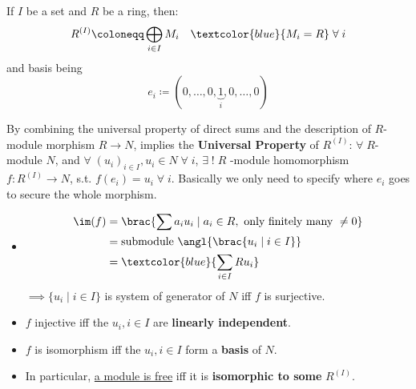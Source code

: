 \begin{notation}
	If \( I \) be a set and \( R \) be a ring, then:
	\[
		R^{(I)} \coloneqq \bigoplus_{i\in I}M_i \quad \textcolor{blue}{M_i = R} \; \forall \; i
	\]
	and basis being
	\[
		e_i \coloneqq (0, \ldots, 0, \underbrace{1}_{i}, 0, \ldots, 0)
	\]
\end{notation}
By combining the universal property of direct sums and the description of \( R \)-module morphism \(
R \to N\), implies the \textbf{Universal Property} of \( R^{(I)} \): \( \forall \; R  \)-module $N$,
and \( \forall \; (u_i)_{i\in I}, u_i \in N \; \forall \; i \), \( \exists \; ! \; R \) -module
homomorphism \( f: R^{(I)} \to N \), s.t. \( f(e_i) = u_i \; \forall \; i \). Basically we only need
to specify where \( e_i \) goes to secure the whole morphism.

\begin{note}
	\leavevmode
	\begin{itemize}
		\item
		      \[
			      \begin{aligned}
				      \im(f) & = \brac{\sum a_i u_i \; | \; a_i \in R, \text{ only finitely many } \ne 0} \\
				             & = \text{submodule } \angl{\brac{u_i \; | \; i \in I}}                      \\
				             & = \textcolor{blue}{\sum_{i\in I} R u_i}
			      \end{aligned}
		      \]
		      \( \implies \{u_i \; | \; i \in I\} \) is system of generator of \( N \) iff \( f \) is
		      surjective.
		\item \( f \) injective iff the \( u_i, i\in I \) are \textbf{linearly independent}.
		\item \( f \) is isomorphism iff the \( u_i, i\in I \) form a \textbf{basis} of \( N \).
		\item In particular, \underline{a module is free} iff it is \textbf{isomorphic to some} \( R^{(I)} \).
	\end{itemize}
\end{note}

